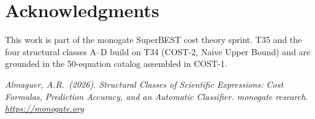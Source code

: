 \documentclass[12pt,a4paper]{article}
\theoremstyle{definition}
\begin{document}
\section*{Acknowledgments}

This work is part of the monogate SuperBEST cost theory sprint.
T35 and the four structural classes A--D build on T34 (COST-2, Naive
Upper Bound) and are grounded in the 50-equation catalog assembled in
COST-1.

\bigskip
\noindent\textit{Almaguer, A.R.\ (2026).
Structural Classes of Scientific Expressions: Cost Formulas, Prediction
Accuracy, and an Automatic Classifier.
monogate research. \url{https://monogate.org}}
\end{document}
